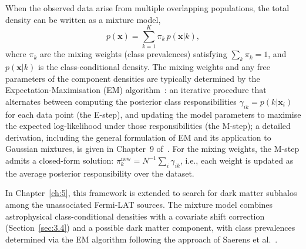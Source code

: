 When the observed data arise from multiple overlapping populations, the total density can be written as a mixture model,
\begin{equation}
	p(\mathbf{x}) = \sum_{k=1}^{K} \pi_k \, p(\mathbf{x}|k),
	\label{eq:mixture_model}
\end{equation}
where $\pi_k$ are the mixing weights (class prevalences) satisfying $\sum_k \pi_k = 1$, and $p(\mathbf{x}|k)$ is the class-conditional density.
The mixing weights and any free parameters of the component densities are typically determined by the Expectation-Maximisation (EM) algorithm~\cite{Dempster:1977}: an iterative procedure that alternates between computing the posterior class responsibilities $\gamma_{ik} = p(k | \mathbf{x}_i)$ for each data point (the E-step), and updating the model parameters to maximise the expected log-likelihood under those responsibilities (the M-step); a detailed derivation, including the general formulation of EM and its application to Gaussian mixtures, is given in Chapter~9 of~\cite{bishop}.
For the mixing weights, the M-step admits a closed-form solution: $\pi_k^\mathrm{new} = N^{-1}\sum_i \gamma_{ik}$, i.e., each weight is updated as the average posterior responsibility over the dataset.

In Chapter~\ref{ch:5}, this framework is extended to search for dark matter subhalos among the unassociated Fermi-LAT sources.
The mixture model combines astrophysical class-conditional densities with a covariate shift correction (Section~\ref{sec:3.4}) and a possible dark matter component, with class prevalences determined via the EM algorithm following the approach of Saerens et al.~\cite{10.1162/089976602753284446_Saerens}.
